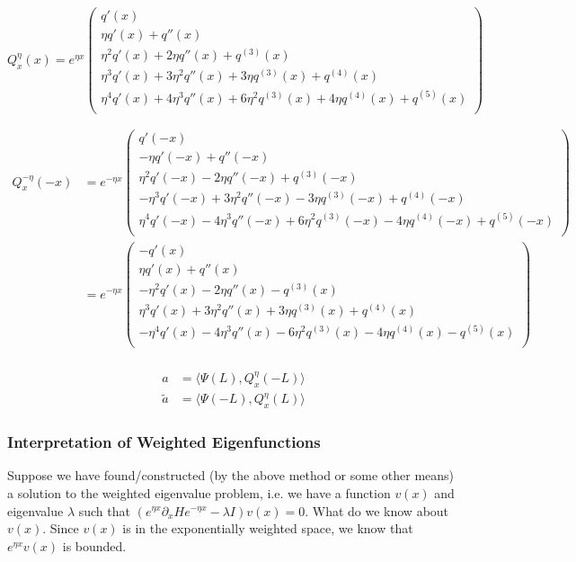 \documentclass[12pt]{article}
\begin{document}
\[
Q^\eta_x(x) = e^{\eta x} \begin{pmatrix}
q'(x) \\
\eta q'(x) + q''(x)\\
\eta^2 q'(x) + 2 \eta q''(x) + q^{(3)}(x) \\
\eta^3 q'(x) + 3 \eta^2 q''(x) + 3 \eta q^{(3)}(x) + q^{(4)}(x) \\
\eta^4 q'(x) + 4 \eta^3 q''(x) + 6 \eta^2 q^{(3)}(x) + 4 \eta q^{(4)}(x) + q^{(5)}(x) \\
\end{pmatrix}
\]

\begin{align*}
Q^{-\eta}_x(-x) &= e^{-\eta x} \begin{pmatrix}
q'(-x) \\
-\eta q'(-x) + q''(-x)\\
\eta^2 q'(-x) - 2 \eta q''(-x) + q^{(3)}(-x) \\
-\eta^3 q'(-x) + 3 \eta^2 q''(-x) - 3 \eta q^{(3)}(-x) + q^{(4)}(-x) \\
\eta^4 q'(-x) - 4 \eta^3 q''(-x) + 6 \eta^2 q^{(3)}(-x) - 4 \eta q^{(4)}(-x) + q^{(5)}(-x) \\
\end{pmatrix} \\
&= e^{-\eta x} \begin{pmatrix}
-q'(x) \\
\eta q'(x) + q''(x)\\
-\eta^2 q'(x) - 2 \eta q''(x) - q^{(3)}(x) \\
\eta^3 q'(x) + 3 \eta^2 q''(x) + 3 \eta q^{(3)}(x) + q^{(4)}(x) \\
-\eta^4 q'(x) - 4 \eta^3 q''(x) - 6 \eta^2 q^{(3)}(x) - 4 \eta q^{(4)}(x) - q^{(5)}(x) \\
\end{pmatrix} \\
\end{align*}

\begin{align*}
a &= \langle \Psi(L), Q^\eta_x(-L) \rangle \\
\tilde{a} &= \langle \Psi(-L), Q^\eta_x(L) \rangle
\end{align*}



\subsubsection*{Interpretation of Weighted Eigenfunctions}

Suppose we have found/constructed (by the above method or some other means) a solution to the weighted eigenvalue problem, i.e. we have a function $v(x)$ and eigenvalue $\lambda$ such that $(e^{\eta x} \partial_x H e^{-\eta x} - \lambda I)v(x) = 0$. What do we know about $v(x)$. Since $v(x)$ is in the exponentially weighted space, we know that $e^{\eta x} v(x)$ is bounded. 
\end{document}
